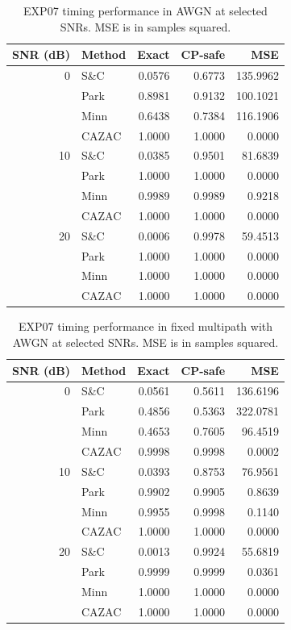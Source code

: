 \begin{table}[htbp]
\centering
\caption{EXP07 timing performance in AWGN at selected SNRs. MSE is in samples squared.}
\label{tab:ch4_awgn}
\small
\begin{tabular}{rlrrr}
\hline
SNR (dB) & Method & Exact & CP-safe & MSE\\
\hline
0 & S\&C & 0.0576 & 0.6773 & 135.9962 \\
 & Park & 0.8981 & 0.9132 & 100.1021 \\
 & Minn & 0.6438 & 0.7384 & 116.1906 \\
 & CAZAC & 1.0000 & 1.0000 & 0.0000 \\
\hline
10 & S\&C & 0.0385 & 0.9501 & 81.6839 \\
 & Park & 1.0000 & 1.0000 & 0.0000 \\
 & Minn & 0.9989 & 0.9989 & 0.9218 \\
 & CAZAC & 1.0000 & 1.0000 & 0.0000 \\
\hline
20 & S\&C & 0.0006 & 0.9978 & 59.4513 \\
 & Park & 1.0000 & 1.0000 & 0.0000 \\
 & Minn & 1.0000 & 1.0000 & 0.0000 \\
 & CAZAC & 1.0000 & 1.0000 & 0.0000 \\
\hline
\end{tabular}
\end{table}

\begin{table}[htbp]
\centering
\caption{EXP07 timing performance in fixed multipath with AWGN at selected SNRs. MSE is in samples squared.}
\label{tab:ch4_mp}
\small
\begin{tabular}{rlrrr}
\hline
SNR (dB) & Method & Exact & CP-safe & MSE\\
\hline
0 & S\&C & 0.0561 & 0.5611 & 136.6196 \\
 & Park & 0.4856 & 0.5363 & 322.0781 \\
 & Minn & 0.4653 & 0.7605 & 96.4519 \\
 & CAZAC & 0.9998 & 0.9998 & 0.0002 \\
\hline
10 & S\&C & 0.0393 & 0.8753 & 76.9561 \\
 & Park & 0.9902 & 0.9905 & 0.8639 \\
 & Minn & 0.9955 & 0.9998 & 0.1140 \\
 & CAZAC & 1.0000 & 1.0000 & 0.0000 \\
\hline
20 & S\&C & 0.0013 & 0.9924 & 55.6819 \\
 & Park & 0.9999 & 0.9999 & 0.0361 \\
 & Minn & 1.0000 & 1.0000 & 0.0000 \\
 & CAZAC & 1.0000 & 1.0000 & 0.0000 \\
\hline
\end{tabular}
\end{table}

